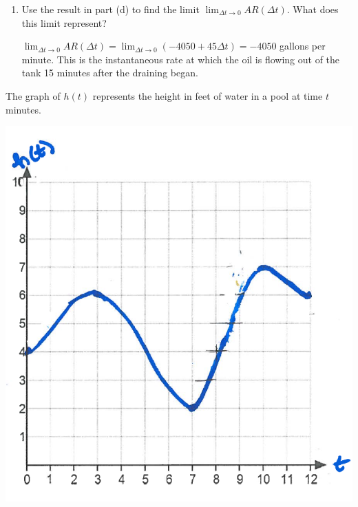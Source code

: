 \documentclass[nooutcomes]{ximera}
\begin{document}
\begin{problem}
\begin{enumerate}
		\item Use the result in part (d) to find the limit $\lim_{\Delta t \to 0} AR(\Delta t)$.  What does this limit represent?
			\begin{freeResponse}
			$\lim_{\Delta t \to 0} AR(\Delta t)=\lim_{\Delta t \to 0} (-4050+45\Delta t) =-4050$ gallons per minute.  This is the instantaneous rate at which the oil is flowing out of the tank 15 minutes after the draining began.
			\end{freeResponse}
	\end{enumerate}
	


\end{problem}


\begin{problem}
The graph of $h(t)$ represents the height in feet of water in a pool at time $t$ minutes.
			\begin{image}
			\includegraphics[scale=.5]{Figure7.png}
			\end{image}
	


\end{problem}
\end{document}
